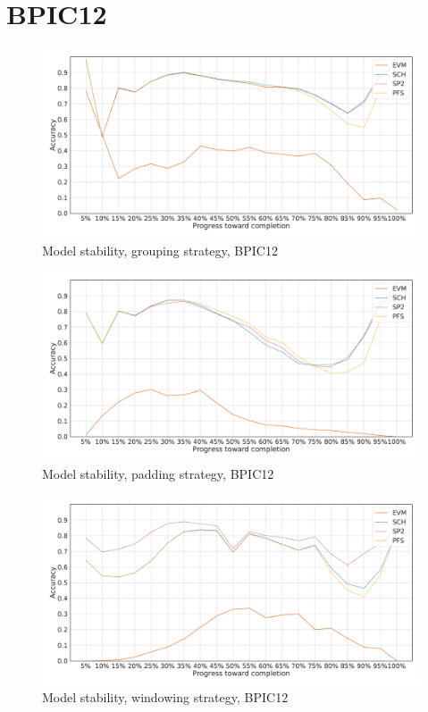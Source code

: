 \FloatBarrier

\section*{BPIC12}\label{appendix:stability:bpic2012}
\begin{figure}[!htb]
    \centering
    \includegraphics[width=\textwidth]{gfx/bpic2012/grouped_stability.pdf}
    \caption{Model stability, grouping strategy, BPIC12}
    \label{fig:bpic12-grouped-stability}
\end{figure}
\begin{figure}[!htb]
    \centering
    \includegraphics[width=\textwidth]{gfx/bpic2012/padded_stability.pdf}
    \caption{Model stability, padding strategy, BPIC12}
    \label{fig:bpic12-padded-stability}
\end{figure}
\begin{figure}[!htb]
    \centering
    \includegraphics[width=\textwidth]{gfx/bpic2012/windowed_stability.pdf}
    \caption{Model stability, windowing strategy, BPIC12}
    \label{fig:bpic12-windowed-stability}
\end{figure}
\FloatBarrier


